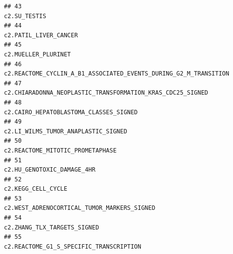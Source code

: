 \documentclass{article}\usepackage[]{graphicx}\usepackage[]{color}
\makeatletter
\newenvironment{kframe}{%
 \def\at@end@of@kframe{}%
 \ifinner\ifhmode%
  \def\at@end@of@kframe{\end{minipage}}%
  \begin{minipage}{\columnwidth}%
 \fi\fi%
 \def\FrameCommand##1{\hskip\@totalleftmargin \hskip-\fboxsep
 \colorbox{shadecolor}{##1}\hskip-\fboxsep
     \hskip-\linewidth \hskip-\@totalleftmargin \hskip\columnwidth}%
 \MakeFramed {\advance\hsize-\width
   \@totalleftmargin\z@ \linewidth\hsize
   \@setminipage}}%
 {\par\unskip\endMakeFramed%
 \at@end@of@kframe}
\newenvironment{knitrout}{}{} %
\makeatother
\begin{document}
\begin{knitrout}
\begin{kframe}
\begin{verbatim}
## 43                                                                                                                                                                                                      c2.SU_TESTIS
## 44                                                                                                                                                                                             c2.PATIL_LIVER_CANCER
## 45                                                                                                                                                                                               c2.MUELLER_PLURINET
## 46                                                                                                                                                  c2.REACTOME_CYCLIN_A_B1_ASSOCIATED_EVENTS_DURING_G2_M_TRANSITION
## 47                                                                                                                                                        c2.CHIARADONNA_NEOPLASTIC_TRANSFORMATION_KRAS_CDC25_SIGNED
## 48                                                                                                                                                                            c2.CAIRO_HEPATOBLASTOMA_CLASSES_SIGNED
## 49                                                                                                                                                                               c2.LI_WILMS_TUMOR_ANAPLASTIC_SIGNED
## 50                                                                                                                                                                                  c2.REACTOME_MITOTIC_PROMETAPHASE
## 51                                                                                                                                                                                        c2.HU_GENOTOXIC_DAMAGE_4HR
## 52                                                                                                                                                                                                c2.KEGG_CELL_CYCLE
## 53                                                                                                                                                                       c2.WEST_ADRENOCORTICAL_TUMOR_MARKERS_SIGNED
## 54                                                                                                                                                                                       c2.ZHANG_TLX_TARGETS_SIGNED
## 55                                                                                                                                                                           c2.REACTOME_G1_S_SPECIFIC_TRANSCRIPTION

\end{verbatim}
\end{kframe}
\end{knitrout}
\end{document}
